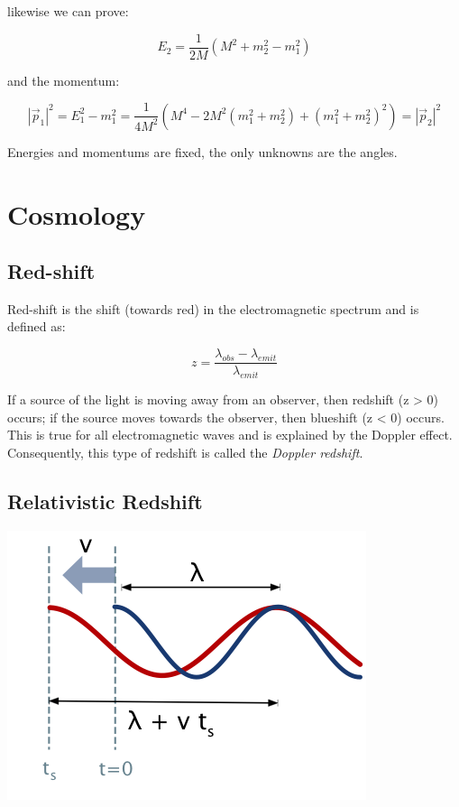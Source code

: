 \documentclass[
  letterpaper,
  DIV=11,
  numbers=noendperiod]{scrreprt}
\begin{document}
likewise we can prove:

\[E_2 = \frac{1}{2M}(M^2 + m_2^2 - m_1^2)\]

and the momentum:

\[{|\vec p_1|^2} = E_1^2 - m_1^2 = \frac{1}{4M^2}(M^4 - 2M^2(m_1^2 + m_2^2) + (m_1^2 + m_2^2)^2) = {|\vec p_2|^2}\]

Energies and momentums are fixed, the only unknowns are the angles.

\section*{Cosmology}\label{cosmology}


\subsection*{Red-shift}\label{red-shift}

Red-shift is the shift (towards red) in the electromagnetic spectrum and
is defined as:

\[z=\frac{\lambda_{obs} - \lambda_{emit}}{\lambda_{emit}}\]

If a source of the light is moving away from an observer, then redshift
(z \textgreater{} 0) occurs; if the source moves towards the observer,
then blueshift (z \textless{} 0) occurs. This is true for all
electromagnetic waves and is explained by the Doppler effect.
Consequently, this type of redshift is called the \emph{Doppler
redshift}.

\subsection*{Relativistic Redshift}\label{relativistic-redshift}

\begin{center}
\includegraphics{images/doppler0.png}
\end{center}
\end{document}
